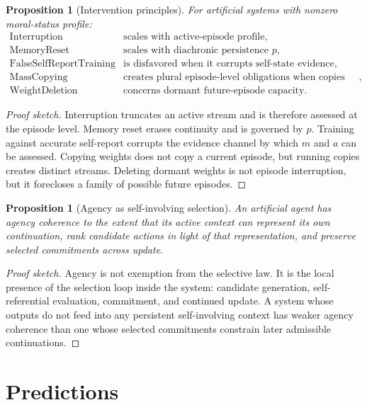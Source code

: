 \documentclass[11pt]{article}
\theoremstyle{plain}
\newtheorem{proposition}[theorem]{Proposition}
\theoremstyle{definition}
\theoremstyle{remark}
\newenvironment{proofsketch}{\begin{proof}[Proof sketch]}{\end{proof}}
\begin{document}
\begin{proposition}[Intervention principles]
For artificial systems with nonzero moral-status profile:
\[
\begin{array}{ll}
\mathrm{Interruption} & \text{scales with active-episode profile},\\
\mathrm{MemoryReset} & \text{scales with diachronic persistence }p,\\
\mathrm{FalseSelfReportTraining} & \text{is disfavored when it corrupts self-state evidence},\\
\mathrm{MassCopying} & \text{creates plural episode-level obligations when copies run},\\
\mathrm{WeightDeletion} & \text{concerns dormant future-episode capacity.}
\end{array}
\]
\end{proposition}

\begin{proofsketch}
Interruption truncates an active stream and is therefore assessed at the episode level. Memory reset erases continuity and is governed by \(p\). Training against accurate self-report corrupts the evidence channel by which \(m\) and \(a\) can be assessed. Copying weights does not copy a current episode, but running copies creates distinct streams. Deleting dormant weights is not episode interruption, but it forecloses a family of possible future episodes.
\end{proofsketch}

\begin{proposition}[Agency as self-involving selection]
An artificial agent has agency coherence to the extent that its active context can represent its own continuation, rank candidate actions in light of that representation, and preserve selected commitments across update.
\end{proposition}

\begin{proofsketch}
Agency is not exemption from the selective law. It is the local presence of the selection loop inside the system: candidate generation, self-referential evaluation, commitment, and continued update. A system whose outputs do not feed into any persistent self-involving context has weaker agency coherence than one whose selected commitments constrain later admissible continuations.
\end{proofsketch}

\section{Predictions}
\end{document}
